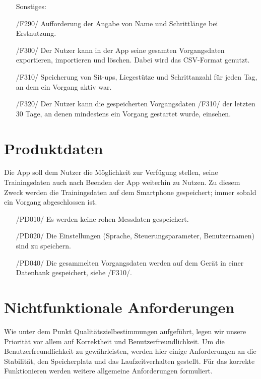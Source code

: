 \documentclass[a4paper,12pt]{article}
\begin{document}
\begin{itemize}
      \item[] \textsf{Sonstiges:}
        \item[/F290/] Aufforderung der Angabe von Name und Schrittlänge bei Erstnutzung.
        \item[/F300/] Der Nutzer kann in der App seine gesamten \Gls{Vorgangsdaten} exportieren, importieren und löschen. Dabei wird das CSV-Format genutzt. 
        \item[/F310/] Speicherung von Sit-ups, Liegestütze und Schrittanzahl für jeden Tag, an dem ein \Gls{Vorgang} aktiv war.
        \item[/F320/] Der Nutzer kann die gespeicherten Vorgangsdaten /F310/ der letzten 30 Tage, an denen mindestens ein Vorgang gestartet wurde, einsehen. 
  
  
      \end{itemize}

\section{Produktdaten}
Die App soll dem Nutzer die Möglichkeit zur Verfügung stellen, seine Trainingsdaten auch nach Beenden der App weiterhin zu Nutzen. Zu diesem Zweck werden die Trainingsdaten auf dem Smartphone gespeichert; immer sobald ein Vorgang abgeschlossen ist.
\begin{itemize}
	\item[/PD010/] Es werden keine rohen Messdaten gespeichert.
	\item[/PD020/] Die Einstellungen (Sprache, \Gls{Steuerungsparameter}, Benutzernamen) sind zu speichern. 
	\item[/PD040/] Die gesammelten \Gls{Vorgangsdaten} werden auf dem Gerät in einer Datenbank gespeichert, siehe /F310/.
\end{itemize}


\section{Nichtfunktionale Anforderungen}
Wie unter dem Punkt Qualitätszielbestimmungen aufgeführt, legen wir unsere Priorität vor allem auf Korrektheit und Benutzerfreundlichkeit. Um die Benutzerfreundlichkeit zu gewährleisten, werden hier einige Anforderungen an die Stabilität, den Speicherplatz und das Laufzeitverhalten gestellt. Für das korrekte Funktionieren werden weitere allgemeine Anforderungen formuliert.
\end{document}
